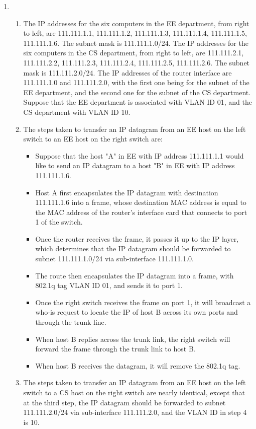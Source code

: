 \documentclass{article}
\begin{document}
\begin{enumerate}
\item
\begin{enumerate}
\item The IP addresses for the six computers in the EE department, from right to left, are 111.111.1.1, 111.111.1.2, 111.111.1.3, 111.111.1.4, 111.111.1.5, 111.111.1.6. The subnet mask is 111.111.1.0/24.
The IP addresses for the six computers in the CS department, from right to left, are 111.111.2.1, 111.111.2.2, 111.111.2.3, 111.111.2.4, 111.111.2.5, 111.111.2.6. The subnet mask is 111.111.2.0/24.
The IP addresses of the router interface are 111.111.1.0 and 111.111.2.0, with the first one being for the subnet of the EE department, and the second one for the subnet of the CS department. Suppose that the EE department is associated with VLAN ID 01, and the CS department with VLAN ID 10.
\item The steps taken to transfer an IP datagram from an EE host on the left switch to an EE host on the right switch are:
\begin{itemize}
\item Suppose that the host "A" in EE with IP address 111.111.1.1 would like to send an IP datagram to a host "B" in EE with IP address 111.111.1.6.
\item Host A first encapsulates the IP datagram with destination 111.111.1.6 into a frame, whose destination MAC address is equal to the MAC address of the router's interface card that connects to port 1 of the switch.
\item Once the router receives the frame, it passes it up to the IP layer, which determines that the IP datagram should be forwarded to subnet 111.111.1.0/24 via sub-interface 111.111.1.0.
\item The route then encapsulates the IP datagram into a frame, with 802.1q tag VLAN ID 01, and sends it to port 1.
\item Once the right switch receives the frame on port 1, it will broadcast a who-is request to locate the IP of host B across its own ports and through the trunk line.
\item When host B replies across the trunk link, the right switch will forward the frame through the trunk link to host B.
\item When host B receives the datagram, it will remove the 802.1q tag.
\end{itemize}
\item The steps taken to transfer an IP datagram from an EE host on the left switch to a CS host on the right switch are nearly identical, except that at the third step, the IP datagram should be forwarded to subnet 111.111.2.0/24 via sub-interface 111.111.2.0, and the VLAN ID in step 4 is 10.
\end{enumerate}


\end{enumerate}
\end{document}
